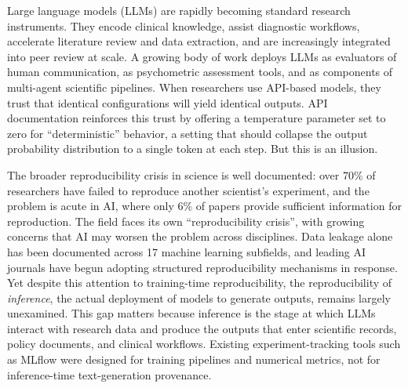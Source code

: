 \documentclass[sn-nature]{sn-jnl}
\begin{document}

\maketitle

\linenumbers


Large language models (LLMs) are rapidly becoming standard research instruments.
They encode clinical knowledge\cite{singhal2023large}, assist diagnostic workflows\cite{thirunavukarasu2023large}, accelerate literature review and data extraction\cite{birhane2023science}, and are increasingly integrated into peer review at scale\cite{thakkar2026llm}.
A growing body of work deploys LLMs as evaluators of human communication\cite{kumar2026reliable}, as psychometric assessment tools\cite{serapiogarcía2025psychometric}, and as components of multi-agent scientific pipelines\cite{xin2025agentic}.
When researchers use API-based models, they trust that identical configurations will yield identical outputs.
API documentation reinforces this trust by offering a temperature parameter set to zero for ``deterministic'' behavior, a setting that should collapse the output probability distribution to a single token at each step.
But this is an illusion.

The broader reproducibility crisis in science is well documented: over 70\% of researchers have failed to reproduce another scientist's experiment\cite{baker2016reproducibility}, and the problem is acute in AI, where only 6\% of papers provide sufficient information for reproduction\cite{gundersen2018state}.
The field faces its own ``reproducibility crisis''\cite{hutson2018artificial}, with growing concerns that AI may worsen the problem across disciplines\cite{ball2023ai}.
Data leakage alone has been documented across 17 machine learning subfields\cite{kapoor2023leakage}, and leading AI journals have begun adopting structured reproducibility mechanisms in response\cite{gundersen2024improving}.
Yet despite this attention to training-time reproducibility, the reproducibility of \emph{inference}, the actual deployment of models to generate outputs, remains largely unexamined.
This gap matters because inference is the stage at which LLMs interact with research data and produce the outputs that enter scientific records, policy documents, and clinical workflows.
Existing experiment-tracking tools such as MLflow\cite{zaharia2018accelerating} were designed for training pipelines and numerical metrics, not for inference-time text-generation provenance.
\end{document}
